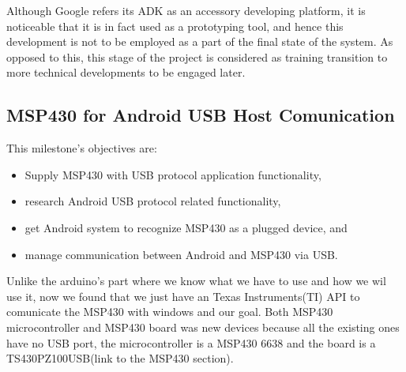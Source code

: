 			\begin{comment}
			Once finished we discover the huge importance of plan this first milestone, that will not be used in 
			then final device, but it was very usefull to train the team about USB comunication in android. 
			Conidering than this milestone was not as easy as we expect, if we had start the research in the second
			milestone which investigation is actualy used in the device, we probably found a lot of troubles that 
			wasn't trully related with the investigation and it would be higly sealed.\\
			\end{comment}
			Although Google refers its ADK as an accessory developing platform, it is noticeable that it is
			in fact used as a prototyping tool, and hence this development is not to be employed as a part
			of the final state of the system. As opposed to this, this stage of the project is considered as
			training transition to more technical developments to be engaged later.
	

		\subsection{MSP430 for Android USB Host Comunication}
		\label{ssec:Android.USB}
		This milestone's objectives are:
		\begin{itemize}
		\item Supply MSP430 with USB protocol application functionality,
		\item research Android USB protocol related functionality,
		\item get Android system to recognize MSP430 as a plugged device, and
		\item manage communication between Android and MSP430 via USB.
		\end{itemize}


		Unlike the arduino's part where we know what we have to use and how we wil use it, now we found that we just have an Texas Instruments(TI) API to comunicate the MSP430 with windows and our goal. Both MSP430 microcontroller and MSP430 board was new devices because all the existing ones have no USB port, the microcontroller is a MSP430 6638 and the board is a TS430PZ100USB(link to the MSP430 section).\\

